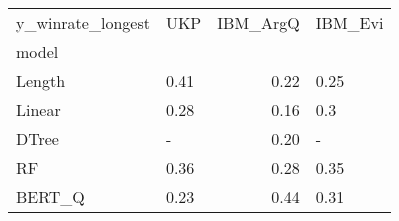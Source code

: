 \begin{tabular}{llrl}
\toprule
y\_winrate\_longest &   UKP &  IBM\_ArgQ & IBM\_Evi \\
model  &       &           &         \\
\midrule
Length &  0.41 &      0.22 &    0.25 \\
Linear &  0.28 &      0.16 &     0.3 \\
DTree  &     - &      0.20 &       - \\
RF     &  0.36 &      0.28 &    0.35 \\
BERT\_Q &  0.23 &      0.44 &    0.31 \\
\bottomrule
\end{tabular}
